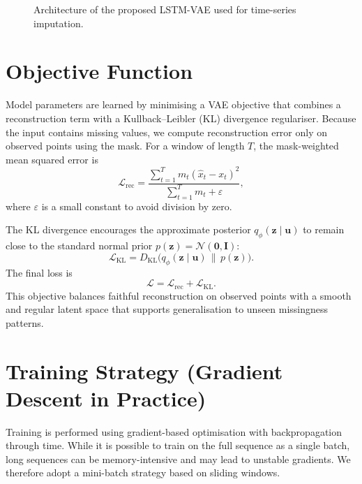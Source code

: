 \begin{figure}[ht]
	\centering
	\caption{Architecture of the proposed LSTM-VAE used for time-series imputation.}
	\label{fig:lstm-vae-arch}
\end{figure}

\section{Objective Function}
Model parameters are learned by minimising a VAE objective that combines a reconstruction term with a Kullback--Leibler (KL) divergence regulariser. Because the input contains missing values, we compute reconstruction error only on observed points using the mask. For a window of length $T$, the mask-weighted mean squared error is
\[
\mathcal{L}_{\mathrm{rec}} = \frac{\sum_{t=1}^{T} m_t \left(\hat{x}_t - x_t\right)^2}{\sum_{t=1}^{T} m_t + \varepsilon},
\]
where $\varepsilon$ is a small constant to avoid division by zero.

The KL divergence encourages the approximate posterior $q_\phi(\mathbf{z}\mid\mathbf{u})$ to remain close to the standard normal prior $p(\mathbf{z})=\mathcal{N}(\mathbf{0},\mathbf{I})$:
\[
\mathcal{L}_{\mathrm{KL}} = D_{\mathrm{KL}}\big(q_\phi(\mathbf{z}\mid\mathbf{u})\,\|\,p(\mathbf{z})\big).
\]
The final loss is
\[
\mathcal{L} = \mathcal{L}_{\mathrm{rec}} + \mathcal{L}_{\mathrm{KL}}.
\]
This objective balances faithful reconstruction on observed points with a smooth and regular latent space that supports generalisation to unseen missingness patterns.

\section{Training Strategy (Gradient Descent in Practice)}
Training is performed using gradient-based optimisation with backpropagation through time. While it is possible to train on the full sequence as a single batch, long sequences can be memory-intensive and may lead to unstable gradients. We therefore adopt a mini-batch strategy based on sliding windows.

